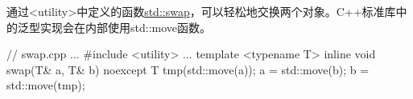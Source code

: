 
通过<utility>中定义的函数\href{http://en.cppreference.com/w/cpp/algorithm/swap}{std::swap}，可以轻松地交换两个对象。C++标准库中的泛型实现会在内部使用std::move函数。


\begin{cpp}
// swap.cpp
...
#include <utility>
...
template <typename T>
inline void swap(T& a, T& b) noexcept {
	T tmp(std::move(a));
	a = std::move(b);
	b = std::move(tmp);
}
\end{cpp}








































